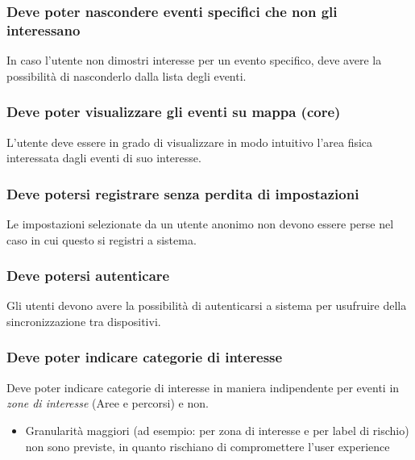 \documentclass{article}
\begin{document}
\subsubsection{Deve poter nascondere eventi specifici che non gli interessano}
\label{5.1.3}
In caso l'utente non dimostri interesse per un evento specifico, deve avere la possibilità di nasconderlo dalla lista degli eventi.

\subsubsection{Deve poter visualizzare gli eventi su mappa (core)}
\label{5.1.4}
L'utente deve essere in grado di visualizzare in modo intuitivo l'area fisica interessata dagli eventi di suo interesse. 

\subsubsection{Deve potersi registrare senza perdita di impostazioni}
\label{5.1.5}
Le impostazioni selezionate da un utente anonimo non devono essere perse nel caso in cui questo si registri a sistema.

\subsubsection{Deve potersi autenticare}
\label{5.1.6}
Gli utenti devono avere la possibilità di autenticarsi a sistema per usufruire della sincronizzazione tra dispositivi.

\subsubsection{Deve poter indicare categorie di interesse}
\label{5.1.7}
Deve poter indicare categorie di interesse in maniera indipendente per eventi in \textit{zone di interesse} (Aree e percorsi) e non.
\begin{itemize}
    \item Granularità maggiori (ad esempio: per zona di interesse e per label di rischio) non sono previste, in quanto rischiano di compromettere l'user experience
\end{itemize}
\end{document}
